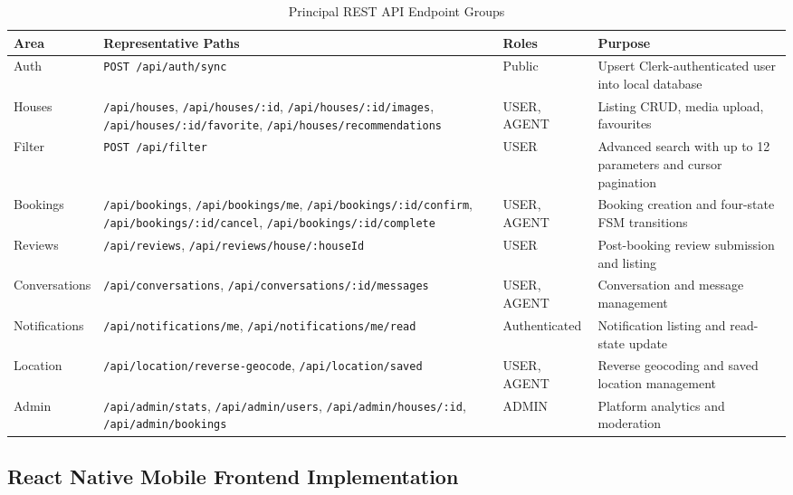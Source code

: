 \documentclass[12pt,a4paper]{report}
\begin{document}
\begin{table}[H]
\caption{Principal REST API Endpoint Groups}
\label{tab:api}
\centering
\small
{}
\begin{tabularx}{\textwidth}{|l|X|l|X|}
\hline
\textbf{Area} & \textbf{Representative Paths} & \textbf{Roles} & \textbf{Purpose} \\
\hline
Auth & \texttt{POST /api/auth/sync} & Public & Upsert Clerk-authenticated user into local database \\
\hline
Houses & \texttt{/api/houses}, \texttt{/api/houses/:id}, \texttt{/api/houses/:id/images}, \texttt{/api/houses/:id/favorite}, \texttt{/api/houses/recommendations} & USER, AGENT & Listing CRUD, media upload, favourites \\
\hline
Filter & \texttt{POST /api/filter} & USER & Advanced search with up to 12 parameters and cursor pagination \\
\hline
Bookings & \texttt{/api/bookings}, \texttt{/api/bookings/me}, \texttt{/api/bookings/:id/confirm}, \texttt{/api/bookings/:id/cancel}, \texttt{/api/bookings/:id/complete} & USER, AGENT & Booking creation and four-state FSM transitions \\
\hline
Reviews & \texttt{/api/reviews}, \texttt{/api/reviews/house/:houseId} & USER & Post-booking review submission and listing \\
\hline
Conversations & \texttt{/api/conversations}, \texttt{/api/conversations/:id/messages} & USER, AGENT & Conversation and message management \\
\hline
Notifications & \texttt{/api/notifications/me}, \texttt{/api/notifications/me/read} & Authenticated & Notification listing and read-state update \\
\hline
Location & \texttt{/api/location/reverse-geocode}, \texttt{/api/location/saved} & USER, AGENT & Reverse geocoding and saved location management \\
\hline
Admin & \texttt{/api/admin/stats}, \texttt{/api/admin/users}, \texttt{/api/admin/houses/:id}, \texttt{/api/admin/bookings} & ADMIN & Platform analytics and moderation \\
\hline
\end{tabularx}
\end{table}

\subsection{React Native Mobile Frontend Implementation}
\end{document}
